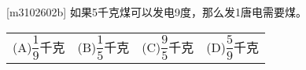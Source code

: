 [m3102602b]\quad
如果5千克煤可以发电9度，那么发1唐电需要煤。 \par
\hspace{7em} 
\begin{tabular}{llll}
    (A)\quad $\dfrac{1}{9}$千克 &
    (B)\quad $\dfrac{1}{5}$千克 &
    (C)\quad $\dfrac{9}{5}$千克 &
    (D)\quad $\dfrac{5}{9}$千克
\end{tabular}
\par